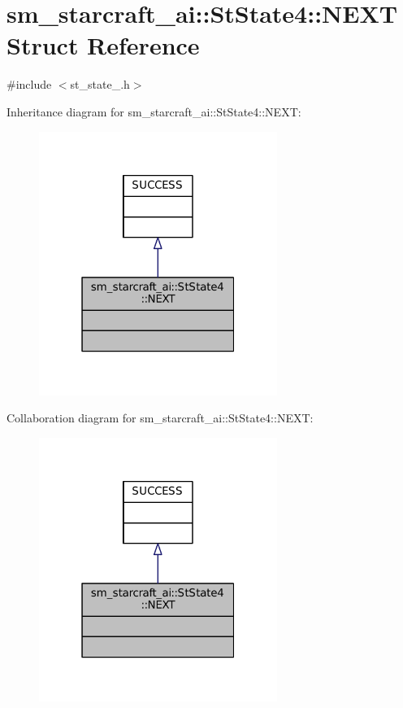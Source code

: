 \hypertarget{structsm__starcraft__ai_1_1StState4_1_1NEXT}{}\section{sm\+\_\+starcraft\+\_\+ai\+:\+:St\+State4\+:\+:N\+E\+XT Struct Reference}
\label{structsm__starcraft__ai_1_1StState4_1_1NEXT}


{\ttfamily \#include $<$st\+\_\+state\+\_.\+h$>$}



Inheritance diagram for sm\+\_\+starcraft\+\_\+ai\+:\+:St\+State4\+:\+:N\+E\+XT\+:
\nopagebreak
\begin{figure}[H]
\begin{center}
\leavevmode
\includegraphics[width=220pt]{structsm__starcraft__ai_1_1StState4_1_1NEXT__inherit__graph}
\end{center}
\end{figure}


Collaboration diagram for sm\+\_\+starcraft\+\_\+ai\+:\+:St\+State4\+:\+:N\+E\+XT\+:
\nopagebreak
\begin{figure}[H]
\begin{center}
\leavevmode
\includegraphics[width=220pt]{structsm__starcraft__ai_1_1StState4_1_1NEXT__coll__graph}
\end{center}
\end{figure}


